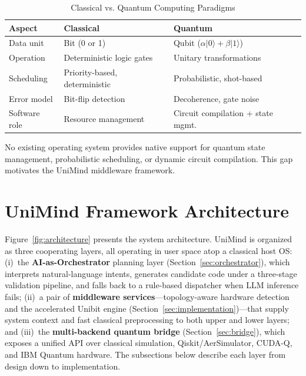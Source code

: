 ﻿\documentclass[12pt,a4paper]{article}
\begin{document}
\begin{table}[H]
\centering
\caption{Classical vs. Quantum Computing Paradigms}
\label{tab:comparison}
\small
\begin{tabular}{@{}lll@{}}
\hline
\textbf{Aspect} & \textbf{Classical} & \textbf{Quantum} \\
\hline
Data unit & Bit (0 or 1) & Qubit ($\alpha|0\rangle + \beta|1\rangle$) \\
Operation & Deterministic logic gates & Unitary transformations \\
Scheduling & Priority-based, deterministic & Probabilistic, shot-based \\
Error model & Bit-flip detection & Decoherence, gate noise \\
Software role & Resource management & Circuit compilation + state mgmt. \\
\hline
\end{tabular}
\end{table}

No existing operating system provides native support for quantum state management, probabilistic scheduling, or dynamic circuit compilation. This gap motivates the UniMind middleware framework.


\section{UniMind Framework Architecture}\label{sec:architecture}

Figure~\ref{fig:architecture} presents the system architecture. UniMind is organized as three cooperating layers, all operating in user space atop a classical host OS: (i)~the \textbf{AI-as-Orchestrator} planning layer (Section~\ref{sec:orchestrator}), which interprets natural-language intents, generates candidate code under a three-stage validation pipeline, and falls back to a rule-based dispatcher when LLM inference fails; (ii)~a pair of \textbf{middleware services}---topology-aware hardware detection and the accelerated Unibit engine (Section~\ref{sec:implementation})---that supply system context and fast classical preprocessing to both upper and lower layers; and (iii)~the \textbf{multi-backend quantum bridge} (Section~\ref{sec:bridge}), which exposes a unified API over classical simulation, Qiskit/AerSimulator, CUDA-Q, and IBM Quantum hardware. The subsections below describe each layer from design down to implementation.
\end{document}

